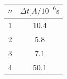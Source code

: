 \label{tab:tabAuge}
	\begin{tabular}{S[table-format=1.0]S[table-format=2.1]}
		\toprule
		{$n$} & {$\Delta t_.A/10^{-6}\si{\second}$} \\
		 & 10.4 \\
		2 & 5.8 \\
		3 & 7.1 \\
		4 & 50.1 \\
		\bottomrule
	\end{tabular}
